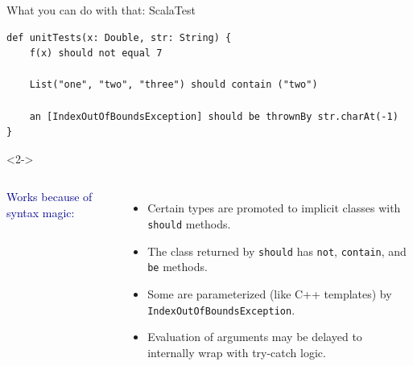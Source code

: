\documentclass[aspectratio=169]{beamer}
\begin{document}
\begin{frame}[fragile]{What you can do with that: ScalaTest}
\vspace{0.25 cm}

\small
\begin{verbatim}
def unitTests(x: Double, str: String) {
    f(x) should not equal 7

    List("one", "two", "three") should contain ("two")

    an [IndexOutOfBoundsException] should be thrownBy str.charAt(-1)
}
\end{verbatim}

\vspace{0.25 cm}
\begin{uncoverenv}<2->
\begin{columns}
\large
\textcolor{darkblue}{Works because of syntax magic:}

\normalsize
\begin{itemize}
\item Certain types are promoted to implicit classes with \texttt{should} methods.
\item The class returned by \texttt{should} has \texttt{not}, \texttt{contain}, and \texttt{be} methods.
\item Some are parameterized (like C++ templates) by \texttt{IndexOutOfBoundsException}.
\item Evaluation of arguments may be delayed to internally wrap with try-catch logic.
\end{itemize}

\large
\vspace{0.25 cm}
\end{columns}
\end{uncoverenv}
\end{frame}
\end{document}
